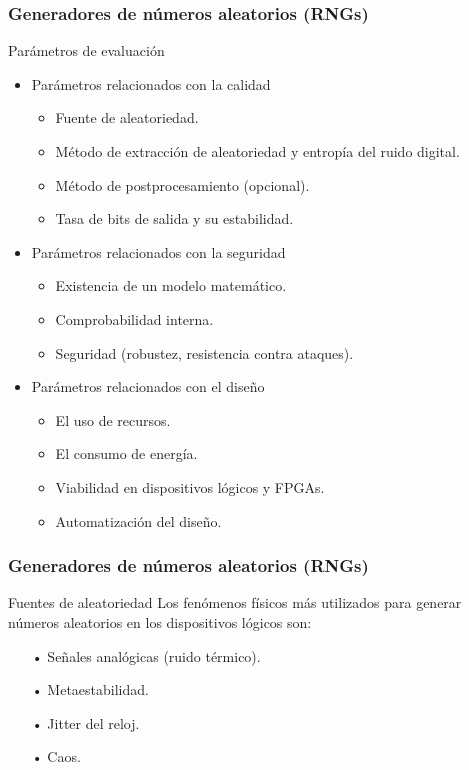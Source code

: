 \documentclass[10pt]{beamer}
\begin{document}
\begin{frame}
    \frametitle{Generadores de números aleatorios (RNGs)}
    \begin{block}{Parámetros de evaluación}
        \justifying
		\begin{itemize}
		    \item Parámetros relacionados con la calidad
		        \begin{itemize}
		            \item Fuente de aleatoriedad.
		            \item Método de extracción de aleatoriedad y entropía del ruido digital.
		            \item Método de postprocesamiento (opcional).
		            \item Tasa de bits de salida y su estabilidad.
		        \end{itemize}
		    \item Parámetros relacionados con la seguridad
		        \begin{itemize}
		            \item Existencia de un modelo matemático.
		            \item Comprobabilidad interna.
		            \item Seguridad (robustez, resistencia contra ataques).
		        \end{itemize}
		    \item Parámetros relacionados con el diseño
		        \begin{itemize}
		            \item El uso de recursos.
		            \item El consumo de energía.
		            \item Viabilidad en dispositivos lógicos y FPGAs.
		            \item Automatización del diseño.
		        \end{itemize}
		\end{itemize}   
		\vspace{0.1cm}
	\end{block}
\end{frame}

\begin{frame}
    \frametitle{Generadores de números aleatorios (RNGs)}
    \begin{block}{Fuentes de aleatoriedad}
        \justifying
        Los fenómenos físicos más utilizados para generar números aleatorios en los dispositivos lógicos son:
        
        \begin{itemize}
            \item[•] Señales analógicas (ruido térmico).
            \item[•] Metaestabilidad.
            \item[•] Jitter del reloj.
            \item[•] Caos.
        \end{itemize}
	\end{block}
\end{frame}
\end{document}
